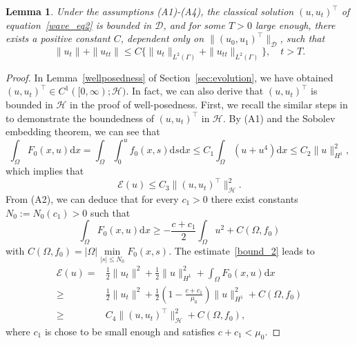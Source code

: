 \documentclass{elsarticle}
\newtheorem{lemma}{Lemma}[section]
\begin{document}
\begin{lemma}\label{solu:boundedness}
Under the assumptions {\rm(A1)}-{\rm(A4)}, the classical solution $(u, u_t)^\top$ of equation~\eqref{wave_eq2} is bounded in $\mathcal{D}$, and for some $T>0$ large enough, there exists a positive constant $C$, dependent only on $\|(u_0, u_1)^\top\|_{\mathcal{D}}$, such that
\begin{equation}\label{important_inequal}
	\|u_t\|  + \|u_{tt}\| \leqslant C\{\|u_t\|_{L^2(\Gamma)}  + \|u_{tt}\|_{L^2(\Gamma)}\}, \quad t>T.
\end{equation}
\end{lemma}
\begin{proof}
In Lemma~\ref{wellposedness} of Section~\ref{sec:evolution}, we have obtained $(u, u_t)^\top \in C^1([0, \infty); \mathcal{H})$. In fact, we can also derive that $(u, u_t)^\top$ is bounded in $\mathcal{H}$ in the proof of well-posedness. First, we recall the similar steps in \cite[Page 1912-1913]{CEL2002} to demonstrate the boundedness of $(u, u_t)^\top$ in $\mathcal{H}$. By (A1) and the Sobolev embedding theorem, we can see that
\[
\int_{\Omega}F_0(x, u)\mathrm{d}x=\int_{\Omega}\int_{0}^{u}f_0(x, s)\mathrm{d}s\mathrm{d}x\leqslant C_1\int_{\Omega}\left(u+u^4\right) \mathrm{d}x\leqslant C_2\|u\|^2_{H^1},
\]
which implies that 
\begin{equation}\label{bound_1}
\mathcal{E}(u)\leqslant C_3\|(u, u_t)^\top\|^2_{\mathcal{H}}.
\end{equation}
From (A2), we can deduce that for every $c_1>0$ there exist constants $N_0:=N_0(c_1)>0$ such that 
\begin{equation}\label{bound_2}
\int_{\Omega}F_0(x, u)\mathrm{d}x\geqslant -\frac{c+c_1}{2}\int_{\Omega}u^2 + C(\Omega, f_0)
\end{equation}
with $C(\Omega, f_0) =|\Omega| \min\limits_{|s|\leqslant N_0}F_0(x, s)$. The estimate~\eqref{bound_2} leads to
\begin{equation}\label{bound_3}
\begin{split}
\mathcal{E}(u) =& \frac{1}{2}\|u_t\|^2+\frac{1}{2}\|u\|^2_{H^1} + \int_{\Omega}F_0(x, u)\mathrm{d}x\\
\geqslant&\frac{1}{2}\|u_t\|^2 + \frac{1}{2}\left(1-\frac{c+c_1}{\mu_0}\right)\|u\|_{H^1}^2 + C(\Omega, f_0)\\
\geqslant&C_4\|(u, u_t)^\top\|^2_{\mathcal{H}} + C(\Omega, f_0),
\end{split}
\end{equation}
where $c_1$ is chose to be small enough and satisfies $c+c_1 < \mu_0$.

\end{proof}
\end{document}
